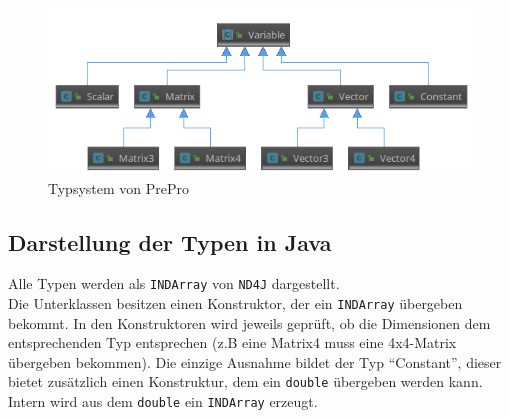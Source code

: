 \begin{figure}[H]
	\centering
	\includegraphics[width=\textwidth]{figures/typsystem}
	\caption{Typsystem von PrePro}
	\label{fig:Typsystem}
\end{figure}

\subsection{Darstellung der Typen in Java}
Alle Typen werden als \texttt{INDArray} von \texttt{ND4J} dargestellt.\\
Die Unterklassen besitzen einen Konstruktor, der ein \texttt{INDArray} übergeben bekommt.
In den Konstruktoren wird jeweils geprüft, ob die Dimensionen dem entsprechenden Typ entsprechen (z.B eine Matrix4 muss eine 4x4-Matrix übergeben bekommen).
Die einzige Ausnahme bildet der Typ ``Constant'', dieser bietet zusätzlich einen Konstruktur, dem ein \texttt{double} übergeben werden kann.
Intern wird aus dem \texttt{double} ein \texttt{INDArray} erzeugt.

